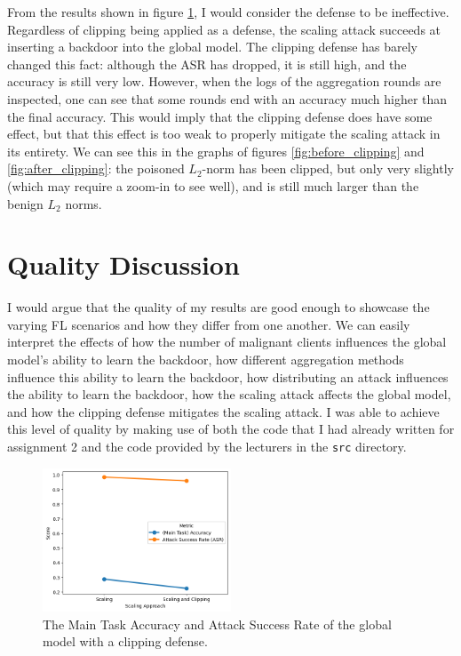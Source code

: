 \documentclass{article}
\begin{document}
From the results shown in figure \ref{fig:clipping_defense}, I would consider the defense to be ineffective.
Regardless of clipping being applied as a defense, the scaling attack succeeds at inserting a backdoor into the global model.
The clipping defense has barely changed this fact: although the ASR has dropped, it is still high, and the accuracy is still very low.
However, when the logs of the aggregation rounds are inspected, one can see that some rounds end with an accuracy much higher than the final accuracy.
This would imply that the clipping defense does have some effect, but that this effect is too weak to properly mitigate the scaling attack in its entirety.
We can see this in the graphs of figures \ref{fig:before_clipping} and \ref{fig:after_clipping}: the poisoned $L_2$-norm has been clipped, but only very slightly (which may require a zoom-in to see well), and is still much larger than the benign $L_2$ norms.

\section{Quality Discussion}
I would argue that the quality of my results are good enough to showcase the varying FL scenarios and how they differ from one another.
We can easily interpret the effects of how the number of malignant clients influences the global model's ability to learn the backdoor, how different aggregation methods influence this ability to learn the backdoor, how distributing an attack influences the ability to learn the backdoor, how the scaling attack affects the global model, and how the clipping defense mitigates the scaling attack.
I was able to achieve this level of quality by making use of both the code that I had already written for assignment 2 and the code provided by the lecturers in the \texttt{src} directory.

\begin{figure}[h]
    \centering
    \includegraphics[width=0.5\textwidth]{clipping_defense.png}
    \caption{The Main Task Accuracy and Attack Success Rate of the global model with a clipping defense.}
    \label{fig:clipping_defense}
\end{figure}
\end{document}

